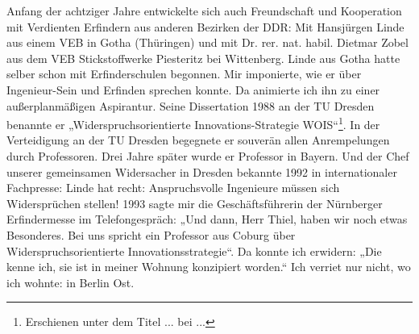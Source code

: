 \documentclass[12pt,a4paper]{article}
\begin{document}
Anfang der achtziger Jahre entwickelte sich auch Freundschaft und Kooperation
mit Verdienten Erfindern aus anderen Bezirken der DDR: Mit Hansjürgen Linde
aus einem VEB in Gotha (Thüringen) und mit Dr. rer. nat. habil. Dietmar Zobel
aus dem VEB Stickstoffwerke Piesteritz bei Wittenberg. Linde aus Gotha hatte
selber schon mit Erfinderschulen begonnen. Mir imponierte, wie er über
Ingenieur-Sein und Erfinden sprechen konnte. Da animierte ich ihn zu einer
außerplanmäßigen Aspirantur. Seine Dissertation 1988 an der TU Dresden
benannte er „Widerspruchsorientierte Innovations-Strategie
WOIS“\footnote{Erschienen unter dem Titel ... bei ...}. In der Verteidigung an
der TU Dresden begegnete er souverän allen Anrempelungen durch Professoren.
Drei Jahre später wurde er Professor in Bayern. Und der Chef unserer
gemeinsamen Widersacher in Dresden bekannte 1992 in internationaler
Fachpresse: Linde hat recht: Anspruchsvolle Ingenieure müssen sich
Widersprüchen stellen! 1993 sagte mir die Geschäftsführerin der Nürnberger
Erfindermesse im Telefongespräch: „Und dann, Herr Thiel, haben wir noch etwas
Besonderes. Bei uns spricht ein Professor aus Coburg über
Widerspruchsorientierte Innovationsstrategie“. Da konnte ich erwidern: „Die
kenne ich, sie ist in meiner Wohnung konzipiert worden.“ Ich verriet nur
nicht, wo ich wohnte: in Berlin Ost.
\end{document}
